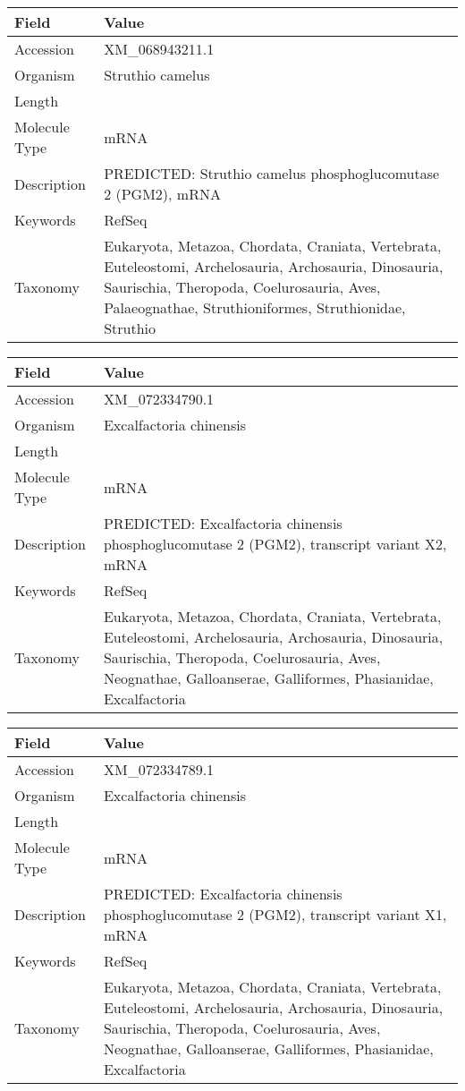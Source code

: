 \documentclass[10pt]{article}
\begin{document}
\vspace{1em}
{\footnotesize
\begin{longtable}{>{\raggedright\arraybackslash}p{4.5cm} >{\raggedright\arraybackslash}p{11.5cm}}
\textbf{Field} & \textbf{Value} \\
\hline
Accession & XM\_068943211.1 \\
Organism & Struthio camelus \\
Length & 2179 \\
Molecule Type & mRNA \\
Description & PREDICTED: Struthio camelus phosphoglucomutase 2 (PGM2), mRNA \\
Keywords & RefSeq \\
Taxonomy & Eukaryota, Metazoa, Chordata, Craniata, Vertebrata, Euteleostomi, Archelosauria, Archosauria, Dinosauria, Saurischia, Theropoda, Coelurosauria, Aves, Palaeognathae, Struthioniformes, Struthionidae, Struthio \\
\end{longtable}
}

\vspace{1em}
{\footnotesize
\begin{longtable}{>{\raggedright\arraybackslash}p{4.5cm} >{\raggedright\arraybackslash}p{11.5cm}}
\textbf{Field} & \textbf{Value} \\
\hline
Accession & XM\_072334790.1 \\
Organism & Excalfactoria chinensis \\
Length & 2015 \\
Molecule Type & mRNA \\
Description & PREDICTED: Excalfactoria chinensis phosphoglucomutase 2 (PGM2), transcript variant X2, mRNA \\
Keywords & RefSeq \\
Taxonomy & Eukaryota, Metazoa, Chordata, Craniata, Vertebrata, Euteleostomi, Archelosauria, Archosauria, Dinosauria, Saurischia, Theropoda, Coelurosauria, Aves, Neognathae, Galloanserae, Galliformes, Phasianidae, Excalfactoria \\
\end{longtable}
}

\vspace{1em}
{\footnotesize
\begin{longtable}{>{\raggedright\arraybackslash}p{4.5cm} >{\raggedright\arraybackslash}p{11.5cm}}
\textbf{Field} & \textbf{Value} \\
\hline
Accession & XM\_072334789.1 \\
Organism & Excalfactoria chinensis \\
Length & 4233 \\
Molecule Type & mRNA \\
Description & PREDICTED: Excalfactoria chinensis phosphoglucomutase 2 (PGM2), transcript variant X1, mRNA \\
Keywords & RefSeq \\
Taxonomy & Eukaryota, Metazoa, Chordata, Craniata, Vertebrata, Euteleostomi, Archelosauria, Archosauria, Dinosauria, Saurischia, Theropoda, Coelurosauria, Aves, Neognathae, Galloanserae, Galliformes, Phasianidae, Excalfactoria \\
\end{longtable}
}
\end{document}
